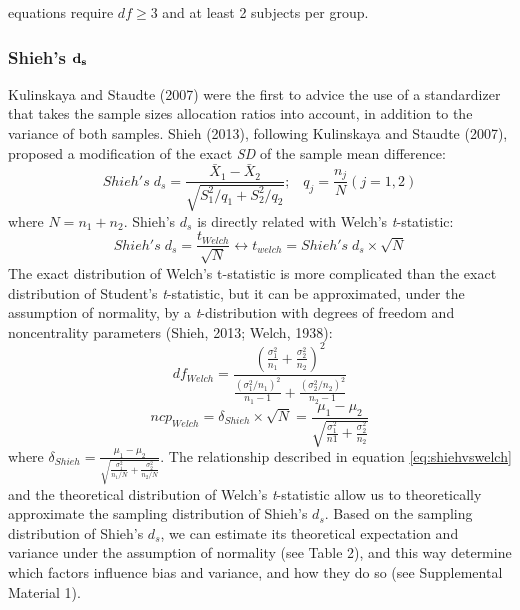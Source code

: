 \documentclass[
  english,
  man,floatsintext]{apa6}
\begin{document}
\begin{landscape}
equations require \(df \ge 3\) and at least 2 subjects per group.

\end{landscape}
\newpage

\hypertarget{shiehs-bf-d_s}{%
\subsubsection{\texorpdfstring{Shieh's \(\bf d_s\)}{Shieh's \textbackslash bf d\_s}}\label{shiehs-bf-d_s}}

Kulinskaya and Staudte (2007) were the first to advice the use of a standardizer that takes the sample sizes allocation ratios into account, in addition to the variance of both samples. Shieh (2013), following Kulinskaya and Staudte (2007), proposed a modification of the exact \emph{SD} of the sample mean difference:
\begin{equation*} 
Shieh's \; d_s = \frac{\bar{X}_1 - \bar{X}_2}{\sqrt{S_1^2/q_1+S_2^2/q_2}}; \;\;\; q_j=\frac{n_j}{N} (j=1,2)
\label{eq:Shiehds}
\end{equation*}
where \(N = n_1+n_2\). Shieh's \(d_{s}\) is directly related with Welch's \emph{t}-statistic:
\begin{equation} 
Shieh's \; d_s=\frac{t_{Welch}}{\sqrt{N}}\leftrightarrow t_{welch} = Shieh's \; d_s \times \sqrt{N}
\label{eq:shiehvswelch}
\end{equation}
The exact distribution of Welch's t-statistic is more complicated than the exact distribution of Student's \emph{t}-statistic, but it can be approximated, under the assumption of normality, by a \emph{t}-distribution with degrees of freedom and noncentrality parameters (Shieh, 2013; Welch, 1938):
\begin{equation} 
df_{Welch} = \frac{\left(\frac{\sigma^2_1}{n_1}+\frac{\sigma^2_2}{n_2} \right)^2}{\frac{(\sigma^2_1/n_1)^2}{n_1-1}+\frac{(\sigma^2_2/n_2)^2}{n_2-1}}
\label{eq:welchdf}
\end{equation}
\begin{equation*} 
ncp_{Welch} = \delta_{Shieh} \times \sqrt{N} = \frac{\mu_1-\mu_2}{\sqrt{\frac{\sigma_1^2}{n1}+\frac{\sigma_2^2}{n_2}}}
\label{eq:welchncp}
\end{equation*}
where \(\delta_{Shieh}=\frac{\mu_1-\mu_2}{\sqrt{\frac{\sigma_1^2}{n_1/N}+\frac{\sigma_2^2}{n_2/N}}}\). The relationship described in equation \ref{eq:shiehvswelch} and the theoretical distribution of Welch's \emph{t}-statistic allow us to theoretically approximate the sampling distribution of Shieh's \(d_s\). Based on the sampling distribution of Shieh's \(d_s\), we can estimate its theoretical expectation and variance under the assumption of normality (see Table 2), and this way determine which factors influence bias and variance, and how they do so (see Supplemental Material 1).
\end{document}
